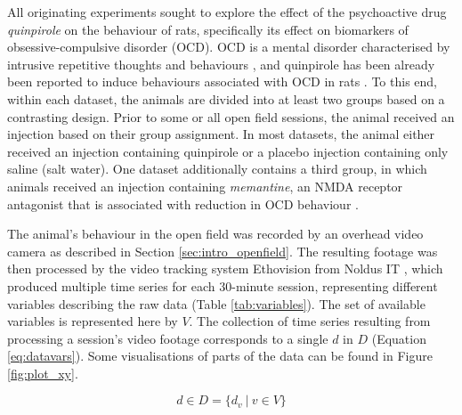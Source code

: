 \documentclass[conference,a4paper,twoside]{IEEEtran}
\newcommand\given[1][]{\:#1\vert\:}
\begin{document}
All originating experiments sought to explore the effect of the psychoactive drug \emph{quinpirole} on the behaviour of rats, specifically its effect on biomarkers of obsessive-compulsive disorder (OCD). OCD is a mental disorder characterised by intrusive repetitive thoughts and behaviours \cite{stein2002obsessive}, and quinpirole has been already been reported to induce behaviours associated with OCD in rats \cite{szechtman1998quinpirole}. To this end, within each dataset, the animals are divided into at least two groups based on a contrasting design. Prior to some or all open field sessions, the animal received an injection based on their group assignment. In most datasets, the animal either received an injection containing quinpirole or a placebo injection containing only saline (salt water). One dataset additionally contains a third group, in which animals received an injection containing \emph{memantine}, an NMDA receptor antagonist that is associated with reduction in OCD behaviour \cite{grados2015selective}.

The animal's behaviour in the open field was recorded by an overhead video camera as described in Section \ref{sec:intro_openfield}. The resulting footage was then processed by the video tracking system Ethovision from Noldus IT \cite{noldus2001ethovision}, which produced multiple time series for each 30-minute session, representing different variables describing the raw data (Table \ref{tab:variables}). The set of available variables is represented here by $V$. The collection of time series resulting from processing a session's video footage corresponds to a single $d$ in $D$ (Equation \ref{eq:datavars}). Some visualisations of parts of the data can be found in Figure \ref{fig:plot_xy}.

\begin{equation}\label{eq:datavars}
    d \in D = \{ d_v \given v \in V \}
\end{equation}
\end{document}
